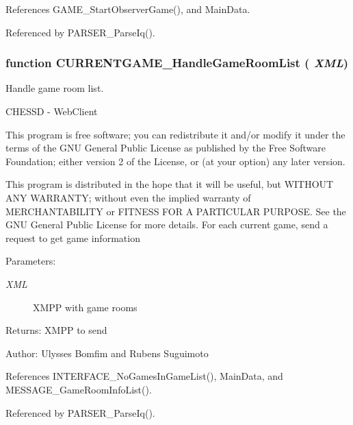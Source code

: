 References GAME\_\-StartObserverGame(), and MainData.

Referenced by PARSER\_\-ParseIq().
\subsubsection[CURRENTGAME\_\-HandleGameRoomList]{\setlength{\rightskip}{0pt plus 5cm}function CURRENTGAME\_\-HandleGameRoomList ( {\em XML})}\label{currentgame_8js_73280a630035d1c1b0c3de530dfee5f8}


Handle game room list. 

CHESSD - WebClient

This program is free software; you can redistribute it and/or modify it under the terms of the GNU General Public License as published by the Free Software Foundation; either version 2 of the License, or (at your option) any later version.

This program is distributed in the hope that it will be useful, but WITHOUT ANY WARRANTY; without even the implied warranty of MERCHANTABILITY or FITNESS FOR A PARTICULAR PURPOSE. See the GNU General Public License for more details. For each current game, send a request to get game information

\begin{Desc}
\item[Parameters:]
\begin{description}
\item[{\em XML}]XMPP with game rooms \end{description}
\end{Desc}
\begin{Desc}
\item[Returns:]XMPP to send \end{Desc}
\begin{Desc}
\item[Author:]Ulysses Bomfim and Rubens Suguimoto \end{Desc}


References INTERFACE\_\-NoGamesInGameList(), MainData, and MESSAGE\_\-GameRoomInfoList().

Referenced by PARSER\_\-ParseIq().